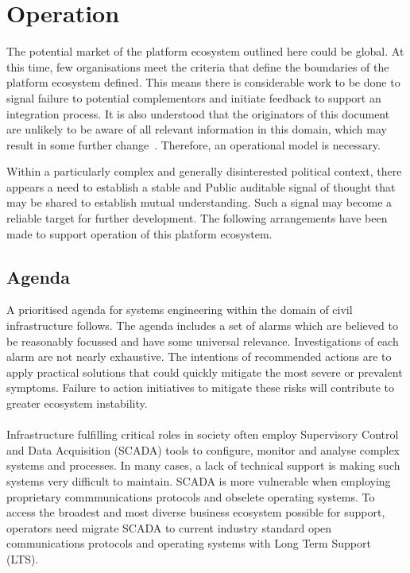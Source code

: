 \documentclass[11pt, oneside]{book}   	%
\begin{document}
\pagebreak

\chapter{Operation}
The potential market of the platform ecosystem outlined here could be global.
At this time, few organisations meet the criteria that define the boundaries of the platform ecosystem defined.
This means there is considerable work to be done to signal failure to potential complementors and initiate feedback to support an integration process.
It is also understood that the originators of this document are unlikely to be aware of all relevant information in this domain, which may result in some further change~\cite{ont1}.
Therefore, an operational model is necessary.\

Within a particularly complex and generally disinterested political context, there appears a need to establish a stable and Public auditable signal of thought that may be shared to establish mutual understanding.
Such a signal may become a reliable target for further development.
The following arrangements have been made to support operation of this platform ecosystem.\

\section{Agenda}
A prioritised agenda for systems engineering within the domain of civil infrastructure follows.
The agenda includes a set of alarms which are believed to be reasonably focussed and have some universal relevance.
Investigations of each alarm are not nearly exhaustive.
The intentions of recommended actions are to apply practical solutions that could quickly mitigate the most severe or prevalent symptoms.
Failure to action initiatives to mitigate these risks will contribute to greater ecosystem instability.

\subsubsection{\color{Red}{P1: Technical Support for Supervisory Control and Data Acquisition}}

Infrastructure fulfilling critical roles in society often employ Supervisory Control and Data Acquisition (SCADA) tools to configure, monitor and analyse complex systems and processes.
In many cases, a lack of technical support is making such systems very difficult to maintain.
SCADA is more vulnerable when employing proprietary commmunications protocols and obselete operating systems.
To access the broadest and most diverse business ecosystem possible for support, operators need migrate SCADA to current industry standard open communications protocols and operating systems with Long Term Support (LTS).\
\end{document}
